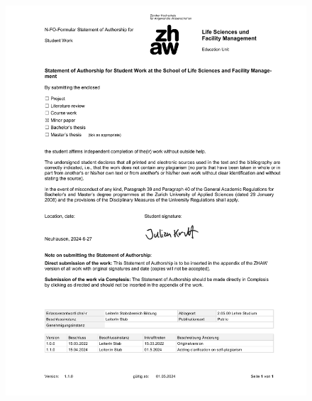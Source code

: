\thispagestyle{empty}
\begin{figure}[h!]
    \centering
    \includegraphics[width=1\textwidth]{figures/denlaration_independence.pdf}
\end{figure}
\restoregeometry %
